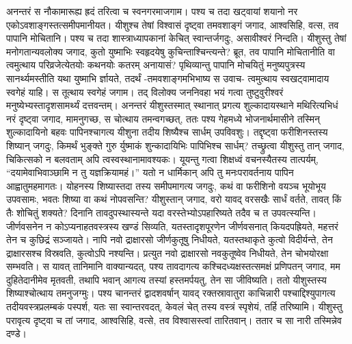 \adhyAya
{}
\vakya अनन्तरं स नौकामारूह्य ह्रदं तरित्वा च स्वनगरमाजगाम।
\vakya पश्य च तदा खट्वायां शयानो नर एकोऽवशाङ्गस्तत्समीपमानीयत। यीशुश्च तेषां विश्वासं दृष्ट्वा तमवशाङ्गं जगाद, आश्वसिहि, वत्स, तव पापानि मोचितानि।
\vakya पश्य च तदा शास्त्राध्यापकानां केचित् स्वान्तर्जगदुः, असावीश्वरं निन्दति।
\vakya यीशुस्तु तेषां मनोगतान्यवलोक्य जगाद, कुतो युष्माभिः स्वहृदयेषु कुचिन्ताश्चिन्त्यन्ते?
\vakya ब्रूत, तव पापानि मोचितानीति वा त्वमुत्थाय परिव्रजेत्येतयोः कथनयोः
\vakya कतरम् अनायासं? पृथिव्यान्तु पापानि मोचयितुं मनुष्यपुत्रस्य सानर्थ्यमस्तीति यथा युष्माभि र्ज्ञायते, तदर्थं -तमवशाङ्गमभिभाष्य स उवाच- त्वमुत्थाय स्वखट्वामादाय स्वगेहं याहि।
\vakya स तूत्थाय स्वगेहं जगाम।
\vakya तद् विलोक्य जननिवहा भयं गत्वा तुष्टुवुरीश्वरं मनुष्येभ्यस्तादृशसामर्थ्यं दत्तवन्तम्।
\vakya अनन्तरं यीशुस्तस्मात् स्थानात् प्रगत्य शुल्कादायस्थाने मथिरित्यभिधं नरं दृष्ट्वा जगाद, मामनुगच्छ, स चोत्थाय तमन्वगच्छत्,
\vakya ततः पश्य गेहमध्ये भोजनार्थमासीने तस्मिन् शुल्कादायिनो बहवः पापिनश्चागत्य यीशुना तदीय शिष्यैश्च सार्धम् उपविवशुः।
\vakya तद्दृष्ट्वा फरीशिनस्तस्य शिष्यान् जगदुः, किमर्थं भुङ्क्ते गुरु र्युष्माकं शुन्कादायिभिः पापिभिश्च सार्धम्?
\vakya तच्छ्रुत्वा यीशुस्तु तान् जगाद, चिकित्सको न बलवताम् अपि त्वस्वस्थानामावश्यकः।
\vakya यूयन्तु गत्वा शिक्षध्वं वचनस्यैतस्य तात्पर्यम्, “दयामेवाभिवाञ्छामि न तु यज्ञक्रियामहं।” यतो न धार्मिकान् अपि तु मनःपरावर्तनाय पापिन आह्वातुमहमागतः।
\vakya योहनस्य शिष्यास्तदा तस्य समीपमागत्य जगदुः, कथं वा फरीशिनो वयञ्च भूयोभूय उपवसामः, भवतः शिष्या वा कथं नोपवसन्ति?
\vakya यीशुस्तान् जगाद, वरो यावद् वरसखैः सार्धं वर्तते, तावत् किं तैः शोचितुं शक्यते? दिनानि तावदुपस्थास्यन्ते यदा वरस्तेभ्योऽपहारिष्यते तदैव च त उपवत्स्यन्ति।
\vakya जीर्णवसनेन न कोऽप्यनाहतवस्त्रस्य खण्डं सिव्यति, यतस्तादृशपूरणेन जीर्णवसनात् कियदपह्रियते, महत्तरं तेन च कुछिद्रं सञ्जायते।
\vakya नापि नवो द्राक्षारसो जीर्णकुतूषु निधीयते, यतस्तथाकृते कुत्वो विदीर्यन्ते, तेन द्राक्षारसश्च विस्रवति, कुत्वोऽपि नश्यन्ति। प्रत्युत नवो द्राक्षारसो नवकुतूष्वेव निधीयते, तेन चोभयोरक्षा सम्भवति।
\vakya स यावत् तानिमानि वाक्यान्यदत्, पश्य तावदागत्य कश्चिदध्यक्षस्तत्समक्षं प्रणिपतन् जगाद, मम दुहितेदानीमेव मृतवती, तथापि भवान् आगत्य तस्यां हस्तमर्पयतु, तेन सा जीविष्यति।
\vakya ततो यीशुस्तस्य शिष्याश्चोत्थाय तमनुजग्मुः।
\vakya पश्य चानन्तरं द्वादशवर्षान् यावद् रक्तस्रावातुरा काचिन्नारी पश्चाद्दिश्युपागत्य तदीयवस्त्रप्रलम्बकं पस्पर्श,
\vakya यतः सा स्वान्तरवदत्, केवलं चेत् तस्य वस्त्रं स्पृशेयं, तर्हि तरिष्यामि।
\vakya यीशुस्तु परावृत्य दृष्ट्वा च तां जगाद, आश्वसिहि, वत्से, तव विश्वासस्त्वां तारितवान्। ततार च सा नारी तस्मिन्नेव दण्डे।
